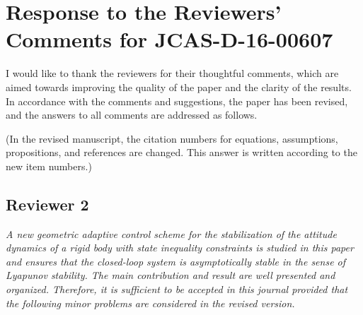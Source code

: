 \documentclass[11pt]{article}
\begin{document}

\section*{Response to the Reviewers' Comments for JCAS-D-16-00607}

I would like to thank the reviewers for their thoughtful comments, which are aimed towards improving the quality of the paper and the clarity of the results. 
In accordance with the comments and suggestions, the paper has been revised, and the answers to all comments are addressed as follows.

(In the revised manuscript, the citation numbers for equations, assumptions, propositions, and references are changed. This answer is written according to the new item numbers.)

\subsection*{Reviewer 2}

\textit{A new geometric adaptive control scheme for the stabilization of the attitude dynamics of a rigid body with state inequality constraints is studied in this paper and ensures that the closed-loop system is asymptotically stable in the sense of Lyapunov stability. The main contribution and result are well presented and organized. Therefore, it is sufficient to be accepted in this journal provided that the following minor problems are considered in the revised version.
}
\end{document}
